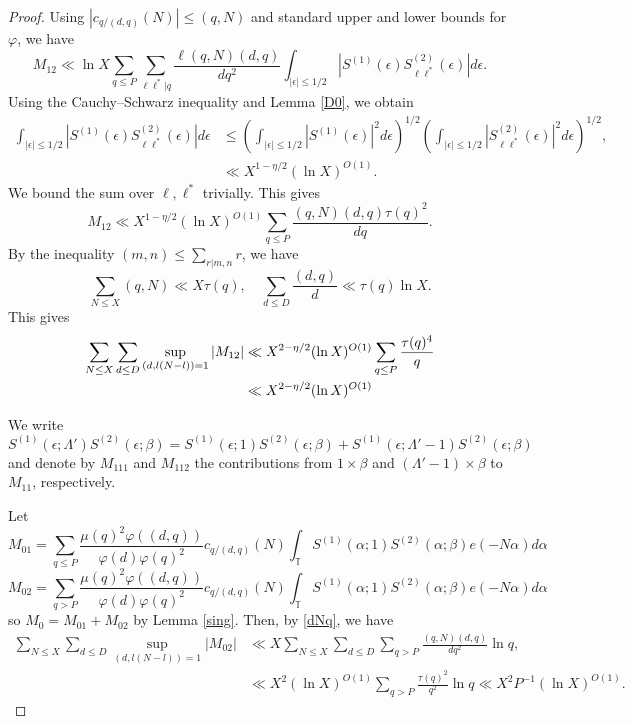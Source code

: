 \documentclass{amsart}
\theoremstyle{definition}
\theoremstyle{remark}
\newcommand{\1}{
    \bm{1}
}
\begin{document}
\begin{proof}
Using $|c_{q/(d,q)}(N)| \leq (q,N)$ and standard upper and lower bounds for $\varphi$, we have
\[ M_{12} \ll \ln{X} \sum_{q \leq P} \sum_{\ell \ell^*|q} \frac{\ell (q,N) (d,q)}{dq^2} \int_{|\epsilon| \leq 1/2} |S^{(1)}(\epsilon) S^{(2)}_{\ell \ell^*}(\epsilon)| d\epsilon. \]
Using the Cauchy--Schwarz inequality and Lemma \ref{D0}, we obtain
\begin{align*}
\int_{|\epsilon| \leq 1/2} |S^{(1)}(\epsilon) S^{(2)}_{\ell \ell^*}(\epsilon)| d\epsilon &\leq \left( \int_{|\epsilon| \leq 1/2} |S^{(1)}(\epsilon)|^2 d\epsilon \right)^{1/2} \left( \int_{|\epsilon| \leq 1/2} |S^{(2)}_{\ell \ell^*}(\epsilon)|^2 d\epsilon \right)^{1/2}, \\
&\ll X^{1-\eta/2} (\ln{X})^{O(1)}. 
\end{align*}
We bound the sum over $\ell, \ell^*$ trivially. This gives
\begin{equation*} M_{12} \ll X^{1-\eta/2} (\ln{X})^{O(1)} \sum_{q \leq P} \frac{(q,N) (d,q) \tau(q)^2}{dq}. \end{equation*}
By the inequality $(m,n) \leq \sum_{r|m,n} r$, we have
\begin{equation} \sum_{N \leq X} (q,N) \ll X \tau(q), \quad \sum_{d \leq D} \frac{(d,q)}{d} \ll \tau(q) \ln{X}. \label{dNq} \end{equation}
This gives
\begin{align}
\sum_{N \leq X} \sum_{d \leq D} \sup_{(d,l(N-l))=1} |M_{12}| &\ll X^{2-\eta/2} (\ln{X})^{O(1)} \sum_{q \leq P} \frac{\tau(q)^4}{q} \notag \\
&\ll X^{2-\eta/2} (\ln{X})^{O(1)} \label{SM12b}
\end{align}

We write
\[ S^{(1)}(\epsilon;\Lambda') S^{(2)}(\epsilon;\beta) = S^{(1)}(\epsilon;1) S^{(2)}(\epsilon;\beta) + S^{(1)}(\epsilon;\Lambda'-1) S^{(2)}(\epsilon;\beta) \]
and denote by $M_{111}$ and $M_{112}$ the contributions from $1 \times \beta$ and $(\Lambda'-1) \times \beta$ to $M_{11}$, respectively. 

Let
\[ M_{01} = \sum_{q \leq P} \frac{\mu(q)^2 \varphi((d,q))}{\varphi(d) \varphi(q)^2} c_{q/(d,q)}(N) \int_{\mathbb{T}} S^{(1)}(\alpha;1) S^{(2)}(\alpha;\beta) e(-N\alpha) d\alpha \]
\[ M_{02} = \sum_{q > P} \frac{\mu(q)^2 \varphi((d,q))}{\varphi(d) \varphi(q)^2} c_{q/(d,q)}(N) \int_{\mathbb{T}} S^{(1)}(\alpha;1) S^{(2)}(\alpha;\beta) e(-N\alpha) d\alpha \]
so $M_0=M_{01}+M_{02}$ by Lemma \ref{sing}. Then, by \eqref{dNq}, we have
\begin{align*}
\sum_{N \leq X} \sum_{d \leq D} \sup_{(d,l(N-l))=1} |M_{02}| &\ll X \sum_{N \leq X} \sum_{d \leq D} \sum_{q > P} \frac{(q,N) (d,q)}{dq^2} \ln{q}, \\
&\ll X^2 (\ln{X})^{O(1)} \sum_{q > P} \frac{\tau(q)^2}{q^2} \ln{q} \ll X^2 P^{-1} (\ln{X})^{O(1)}.
\end{align*}


\end{proof}
\end{document}

